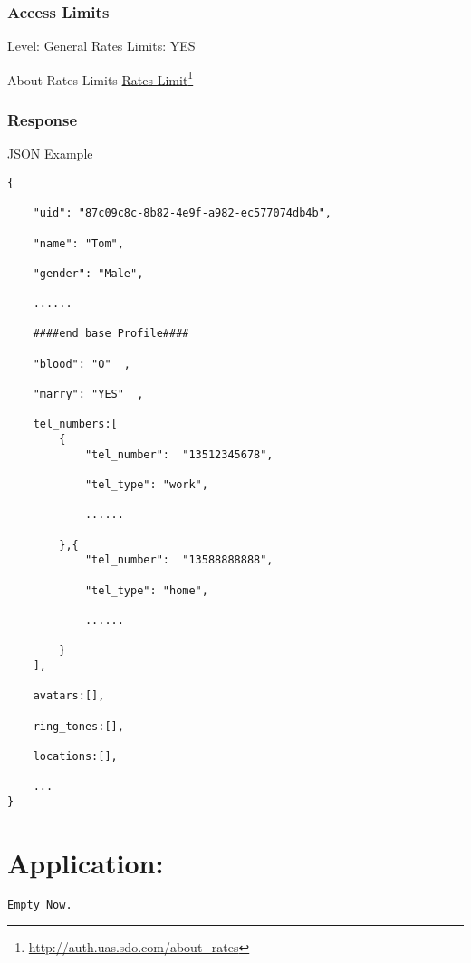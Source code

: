 \section{Access Limits}
\label{accesslimits}

Level: General
Rates Limits: YES

About Rates Limits \href{http://auth.uas.sdo.com/about_rates}{Rates Limit}\footnote{\href{http://auth.uas.sdo.com/about_rates}{http:/\slash auth.uas.sdo.com\slash about\_rates}}

\section{Response}
\label{response}

JSON Example

\begin{verbatim}
{

    "uid": "87c09c8c-8b82-4e9f-a982-ec577074db4b",

    "name": "Tom",

    "gender": "Male",

    ......

    ####end base Profile####

    "blood": "O"  ,

    "marry": "YES"  ,

    tel_numbers:[
        {
            "tel_number":  "13512345678",

            "tel_type": "work",

            ......

        },{
            "tel_number":  "13588888888",

            "tel_type": "home",

            ......

        }
    ],

    avatars:[],

    ring_tones:[],

    locations:[],

    ...
}
\end{verbatim}


\part{Application:}
\label{application:}

\begin{verbatim}
Empty Now.  
\end{verbatim}


